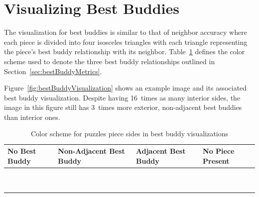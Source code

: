\section{Visualizing Best Buddies}\label{sec:visualizingBestBuddies}

The visualization for best buddies is similar to that of neighbor accuracy where each piece is divided into four isosceles triangles with each triangle representing the piece's best buddy relationship with its neighbor.  Table~\ref{tab:bestBuddyColors} defines the color scheme used to denote the three best buddy relationships outlined in Section~\ref{sec:bestBuddyMetrics}.  

Figure~\ref{fig:bestBuddyVisualization} shows an example image and its associated best buddy visualization.  Despite having 16~times as many interior sides, the image in this figure still has 3~times more exterior, non-adjacent best buddies than interior ones.

\begin{table}[tb]
\begin{center}
  \caption{Color scheme for puzzles piece sides in best buddy visualizations}\label{tab:bestBuddyColors}
  \begin{tabular}{ | >{\centering\arraybackslash}m{1.0in} | >{\centering\arraybackslash}m{1.0in} | >{\centering\arraybackslash}m{1.0in} | >{\centering\arraybackslash}m{1.0in} | }
  
   \hline
    No Best Buddy & Non-Adjacent Best Buddy & Adjacent Best Buddy & No Piece Present  \\ \hline
	{\cellcolor{white}~} & {\cellcolor{red}~} & {\cellcolor{green}~} & {\cellcolor{black}~}  \\
	{\cellcolor{white}~} & {\cellcolor{red}~} & {\cellcolor{green}~} & {\cellcolor{black}~}  \\
 \hline

  \end{tabular}
\end{center}
\end{table}


